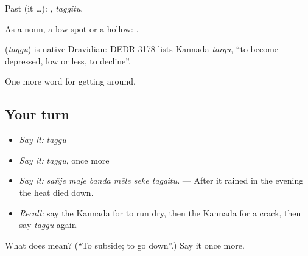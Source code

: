Past (it …): , \emph{taggitu}.

As a noun, a low spot or a hollow:  .

\begin{cousinweb}
\textbf{} (\emph{taggu}) is native Dravidian: DEDR 3178 lists Kannada \emph{targu}, \textquotedblleft{}to become depressed, low or less, to decline\textquotedblright{}.
\end{cousinweb}

\begin{grammarlens}[title={What you've built}]
One more word for getting around.
\end{grammarlens}

\subsection*{Your turn}
\begin{itemize}
\raggedright
  \item \emph{Say it:} \emph{taggu}
  \item \emph{Say it:} \emph{taggu}, once more
  \item \emph{Say it:} \emph{sañje maḷe banda mēle seke taggitu.} — After it rained in the evening the heat died down.
  \item \emph{Recall:} say the Kannada for to run dry, then the Kannada for a crack, then say \emph{taggu} again
\end{itemize}

\begin{tcolorbox}[breakable,colback=teal!4,colframe=teal!35!black,title={Before you move on}]
What does  mean? (\textquotedblleft{}To subside; to go down\textquotedblright{}.) Say it once more.
\end{tcolorbox}

